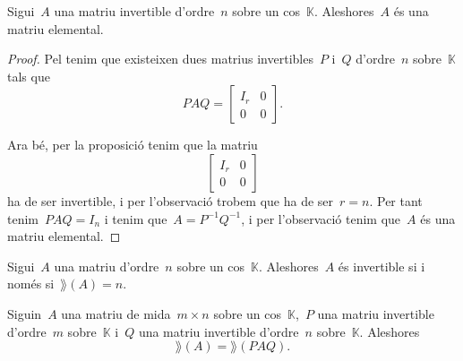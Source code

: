 \documentclass[../../main.tex]{subfiles}
\begin{document}
    \begin{proposition}
        \label{prop:una matriu invertible és producte de matrius elementals}
        Sigui~\(A\) una matriu invertible d'ordre~\(n\) sobre un cos~\(\mathbb{K}\).
        Aleshores~\(A\) és una matriu elemental.
        \begin{proof}
            Pel  tenim que existeixen dues matrius invertibles~\(P\) i~\(Q\) d'ordre~\(n\) sobre~\(\mathbb{K}\) tals que
            \[PAQ=\left[\begin{array}{c|c}
            I_{r} & 0\\\hline
            0 & 0
            \end{array}\right].\]

            Ara bé, per la proposició  tenim que la matriu
            \[\left[\begin{array}{c|c}
            I_{r} & 0\\\hline
            0 & 0
            \end{array}\right]\]
            ha de ser invertible, i per l'observació  trobem que ha de ser~\(r=n\).
            Per tant tenim~\(PAQ=I_{n}\) i tenim que~\(A=P^{-1}Q^{-1}\), i per l'observació  tenim que~\(A\) és una matriu elemental.
        \end{proof}
    \end{proposition}
    \begin{corollary}
        Sigui~\(A\) una matriu d'ordre~\(n\) sobre un cos~\(\mathbb{K}\).
        Aleshores~\(A\) és invertible si i només si~\(\rang(A)=n\).
    \end{corollary}
    \begin{observation}
        \label{obs:rang d'una matriu és invariant pel producte amb invertibles}
        Siguin~\(A\) una matriu de mida~\(m\times n\) sobre un cos~\(\mathbb{K}\),~\(P\) una matriu invertible d'ordre~\(m\) sobre~\(\mathbb{K}\) i~\(Q\) una matriu invertible d'ordre~\(n\) sobre~\(\mathbb{K}\).
        Aleshores
        \[
            \rang(A)=\rang(PAQ).
        \]
    \end{observation}
\end{document}
